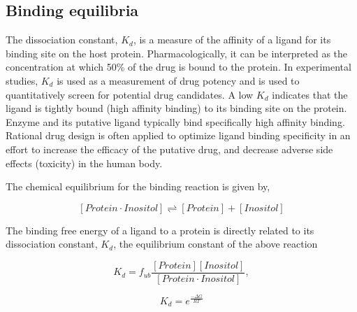\subsection{Binding equilibria}


The dissociation constant, $K_d$, is a measure of the affinity of a ligand for its binding site on the host protein. Pharmacologically, it can be interpreted as the concentration at which 50\% of the drug is bound to the protein. In experimental studies, $K_d$ is used as a measurement of drug potency and is used to quantitatively screen for potential drug candidates.  A low $K_d$ indicates that the ligand is tightly bound (high affinity binding) to its binding site on the protein.  Enzyme and its putative ligand typically bind specifically high affinity binding.  Rational drug design is often applied to optimize ligand binding specificity in an effort to increase the efficacy of the putative drug, and decrease adverse side effects (toxicity) in the human body.

The chemical equilibrium for the binding reaction is given by,

    \begin{equation}
      \left[ Protein\cdot Inositol \right] 
      \rightleftharpoons 
      \left[ Protein \right]+\left[ Inositol \right]
    \end{equation}
  
    
The binding free energy of a ligand to a protein is directly related to its dissociation constant, $K_d$, the equilibrium constant of the above reaction

    
     \begin{equation}
        K_{d} = f_{ub}\frac{\left[ Protein \right]\left[ Inositol \right]}{\left[Protein \cdot Inositol\right]},
     \end{equation}
     
     \begin{equation}
        K_{d} = e^{\frac{-\Delta G}{RT}}
     \end{equation}

